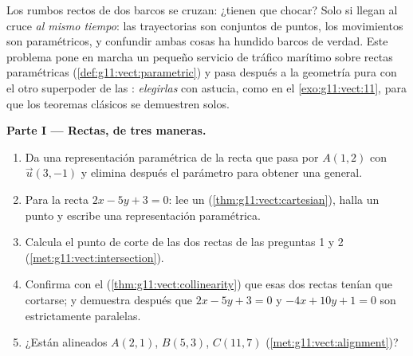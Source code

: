 \begin{problem}
\label{pb:g11:vect:1}
Los rumbos rectos de dos barcos se cruzan: ¿tienen que chocar? Solo si
llegan al cruce \emph{al mismo tiempo}: las trayectorias son conjuntos de
puntos, los movimientos son paramétricos, y confundir ambas cosas ha
hundido barcos de verdad. Este problema pone en marcha un pequeño servicio
de tráfico marítimo sobre rectas paramétricas
(\cref{def:g11:vect:parametric}) y pasa después a la geometría pura con el
otro superpoder de las : \emph{elegirlas} con astucia, como en
el \cref{exo:g11:vect:11}, para que los teoremas clásicos se demuestren
solos.

\medskip
\noindent\textbf{Parte I --- Rectas, de tres maneras.}
\begin{enumerate}
  \item Da una representación paramétrica de la recta que pasa por
        $A(1, 2)$ con  $\vec u(3, -1)$ y elimina después el
        parámetro para obtener una  general.
  \item Para la recta $2x - 5y + 3 = 0$: lee un 
        (\cref{thm:g11:vect:cartesian}), halla un punto y escribe una
        representación paramétrica.
  \item Calcula el punto de corte de las dos rectas de las preguntas 1 y 2
        (\cref{met:g11:vect:intersection}).
  \item Confirma con el  (\cref{thm:g11:vect:collinearity})
        que esas dos rectas tenían que cortarse; y demuestra después que
        $2x - 5y + 3 = 0$ y $-4x + 10y + 1 = 0$ son estrictamente
        paralelas.
  \item ¿Están alineados $A(2, 1)$, $B(5, 3)$, $C(11, 7)$
        (\cref{met:g11:vect:alignment})?
\end{enumerate}


\end{problem}
